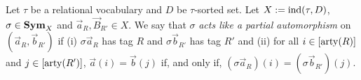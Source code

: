 \documentclass[../paper.tex]{subfiles}
\begin{document}





\begin{definition}
  Let $\tau$ be a relational vocabulary and $D$ be $\tau$-sorted set. Let $X :=
  \text{\upshape ind}(\tau, D)$, $\sigma \in \text{\textbf{Sym}}_X$ and $\vec{a}_R, \vec{B}_{R'} \in X$. We
  say that $\sigma$ \emph{acts like a partial automorphism} on $(\vec{a}_R,
  \vec{b}_{R'})$ if (i) $\sigma \vec{a}_R$ has tag $R$ and $\sigma \vec{b}_{R'}$
  has tag $R'$ and (ii) for all $i \in [\mathrm{arty}(R)]$ and $j \in [\mathrm{arty}(R')]$,
  $\vec{a}(i) = \vec{b}(j)$ if, and only if, $(\sigma \vec{a}_R)(i) = (\sigma
  \vec{b}_{R'})(j)$.
\end{definition}
\end{document}
